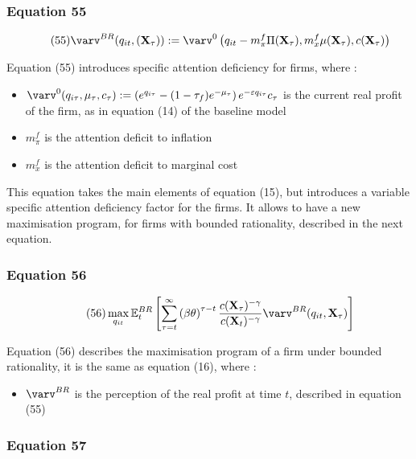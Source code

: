 \documentclass{article}
\begin{document}
\subsubsection*{Equation 55}

\begin{equation}\tag{55}
    \varv^{BR}(q_{it},(\textbf{X}_{\tau})):=\varv^{0}\left(q_{it}-m^{f}_{\pi}\Pi(\textbf{X}_{\tau}),m^{f}_{x}\mu(\textbf{X}_{\tau}),c(\textbf{X}_{\tau})\right)
\end{equation}

Equation (55) introduces specific attention deficiency for firms, where : 
\begin{itemize}
    \item $\varv^{0}(q_{i\tau},\mu_{\tau},c_{\tau}):=\left(e^{q_{i\tau}}-(1-\tau_{f})e^{-\mu_{\tau}}\right)e^{-\varepsilon q_{i\tau}}c_{\tau}$ is the current real profit of the firm, as in equation (14) of the baseline model
    \item $m^{f}_{\pi}$ is the attention deficit to inflation 
    \item $m^{f}_{x}$ is the attention deficit to marginal cost
\end{itemize}

This equation takes the main elements of equation (15), but introduces a variable specific attention deficiency factor for the firms. 
It allows to have a new maximisation program, for firms with bounded rationality, described in the next equation.

\subsubsection*{Equation 56}

\begin{equation}\tag{56}
    \max_{q_{it}}{\mathbb{E}_{t}^{BR}\left[\sum_{\tau=t}^{\infty}\left(\beta\theta\right)^{\tau-t}\frac{c(\textbf{X}_{\tau})^{-\gamma}}{c(\textbf{X}_{t})^{-\gamma}}\varv^{BR}(q_{it},\textbf{X}_{\tau})\right]}
\end{equation}

Equation (56) describes the maximisation program of a firm under bounded rationality, it is the same as equation (16), where : 
\begin{itemize}
    \item $\varv^{BR}$ is the perception of the real profit at time $t$, described in equation (55)
\end{itemize}

\subsubsection*{Equation 57}
\end{document}
